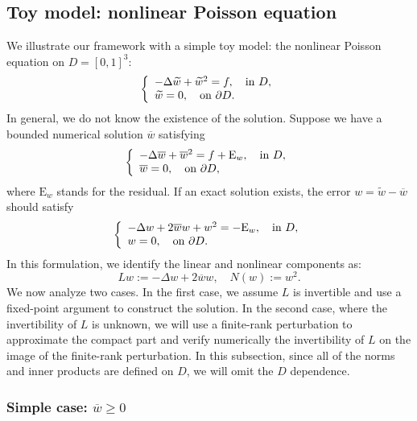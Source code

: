 \documentclass[11pt,a4paper]{article}
\numberwithin{equation}{section}
\newcommand{\Epsilon}{\mathrm{E}}
\newcommand{\assign}{:=}
\begin{document}
\subsection{Toy model: nonlinear Poisson equation}\label{sec:toy}

We illustrate our framework with a simple toy model: the nonlinear Poisson
equation on $D=[0,1]^3$:
\begin{equation*}
  \left\{\begin{array}{l}
    - \Delta \widetilde{w} + \widetilde{w}^2 = f, \text{\quad in } D,\\
    \widetilde{w} = 0, \text{\quad on } \partial D.
  \end{array}\right. \label{eq:nonlin Poisson}
\end{equation*}
In general, we do not know the existence of the solution. Suppose we have a bounded
numerical solution $\overline{w}$ satisfying
\begin{equation*}
  \left\{\begin{array}{l}
    - \Delta \overline{w} + \overline{w}^2 = f + \Epsilon_w, \text{\quad in }
    D,\\
    \overline{w} = 0, \text{\quad on } \partial D,
  \end{array}\right. \label{eq:nonlin Poisson num}
\end{equation*}
where $\Epsilon_w$ stands for the residual. If an exact solution exists, the
error $w = \widetilde{w} - \overline{w}$ should satisfy
\begin{equation}
  \left\{\begin{array}{l}
    - \Delta w + 2 \overline{w} w + w^2 = - \Epsilon_w, \text{\quad in } D,\\
    w = 0, \text{\quad on } \partial D.
  \end{array}\right. \label{eq:nonlin Poisson err}
\end{equation}
In this formulation, we identify the linear and nonlinear components as:
\[ L w \assign - \Delta w + 2 \overline{w} w, \quad N (w) \assign w^2 . \]
We now analyze two cases. In the first case, we assume $L$ is invertible and use a fixed-point argument to construct the solution. In the second case,
where the invertibility of $L$ is unknown, we will use a finite-rank perturbation to approximate the compact part and verify numerically the invertibility of $L$ on the image of the finite-rank perturbation. In this subsection, since all of the norms and inner products are defined on $D$, we will omit the $D$ dependence.

\subsubsection{Simple case: \texorpdfstring{$\overline{w} \geqslant 0$}{overline{w} >= 0}}
\end{document}
